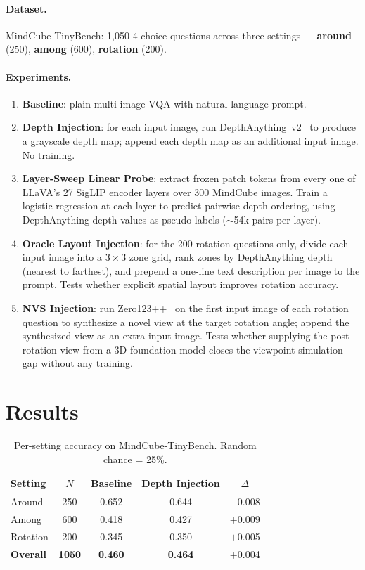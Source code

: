\documentclass[11pt]{article}
\begin{document}
\paragraph{Dataset.}
MindCube-TinyBench: 1{,}050 4-choice questions across three settings ---
\textbf{around} (250), \textbf{among} (600), \textbf{rotation} (200).

\paragraph{Experiments.}
\begin{enumerate}
  \item \textbf{Baseline}: plain multi-image VQA with natural-language prompt.
  \item \textbf{Depth Injection}: for each input image, run DepthAnything~v2~\cite{depthanything}
        to produce a grayscale depth map; append each depth map as an additional
        input image. No training.
  \item \textbf{Layer-Sweep Linear Probe}: extract frozen patch tokens from every
        one of LLaVA's 27 SigLIP encoder layers over 300 MindCube images.
        Train a logistic regression at each layer to predict pairwise depth ordering,
        using DepthAnything depth values as pseudo-labels (${\sim}$54k pairs per layer).
  \item \textbf{Oracle Layout Injection}: for the 200 rotation questions only,
        divide each input image into a $3{\times}3$ zone grid, rank zones by
        DepthAnything depth (nearest to farthest), and prepend a one-line text
        description per image to the prompt. Tests whether explicit spatial layout
        improves rotation accuracy.
  \item \textbf{NVS Injection}: run Zero123++~\cite{zero123pp} on the first input
        image of each rotation question to synthesize a novel view at the target
        rotation angle; append the synthesized view as an extra input image.
        Tests whether supplying the post-rotation view from a 3D foundation model
        closes the viewpoint simulation gap without any training.
\end{enumerate}

\section{Results}

\begin{table}[h]
\centering
\caption{Per-setting accuracy on MindCube-TinyBench. Random chance = 25\%.}
\label{tab:main}
\begin{tabular}{lcccc}
\toprule
Setting & $N$ & Baseline & Depth Injection & $\Delta$ \\
\midrule
Around      & 250 & 0.652 & 0.644 & $-$0.008 \\
Among       & 600 & 0.418 & 0.427 & $+$0.009 \\
Rotation    & 200 & 0.345 & 0.350 & $+$0.005 \\
\midrule
\textbf{Overall} & \textbf{1050} & \textbf{0.460} & \textbf{0.464} & $+$0.004 \\
\bottomrule
\end{tabular}
\end{table}
\end{document}
